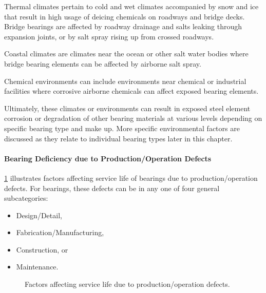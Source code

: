 Thermal climates pertain to cold and wet climates accompanied by snow and ice that result in high usage of
deicing chemicals on roadways and bridge decks. Bridge bearings are affected by roadway drainage and salts
leaking through expansion joints, or by salt spray rising up from crossed roadways.

Coastal climates are climates near the ocean or other salt water bodies where bridge bearing elements can be
affected by airborne salt spray.

Chemical environments can include environments near chemical or industrial facilities where corrosive airborne
chemicals can affect exposed bearing elements.

Ultimately, these climates or environments can result in exposed steel element corrosion or degradation of other
bearing materials at various levels depending on specific bearing type and make up. More specific environmental
factors are discussed as they relate to individual bearing types later in this chapter.


\paragraph{Bearing Deficiency due to Production/Operation Defects}
\label{par:production-defects}
\cref{fig:faulttree-bearing-operation} illustrates factors affecting service life of bearings due to production/operation defects. For
bearings, these defects can be in any one of four general subcategories:
\begin{itemize}
  \item Design/Detail,
  \item Fabrication/Manufacturing,
  \item Construction, or
  \item Maintenance.
\end{itemize}


\begin{figure}
  \caption{Factors affecting service life due to production/operation defects.}
  \label{fig:faulttree-bearing-operation}
\end{figure}

